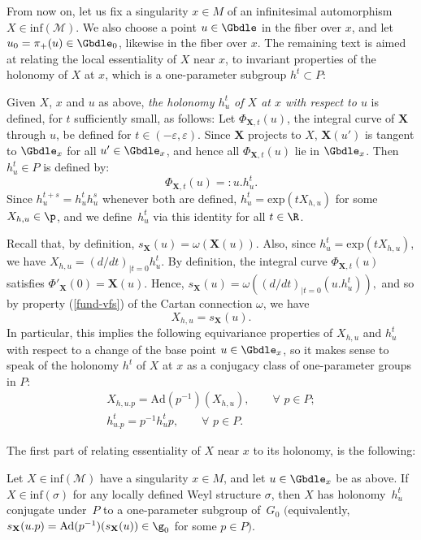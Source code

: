 From now on, let us f\/ix a singularity $x \in M$ of an inf\/initesimal automorphism $X \in \mathrm{inf}(\mathcal{M})$. We also choose a point $u \in \Gbdle$ in the f\/iber over $x$, and let $u_0 = \pi_+(u) \in \Gbdle_0$, likewise in the f\/iber over $x$. The remaining text is aimed at relating the local essentiality of $X$ near $x$, to invariant properties of the holonomy of $X$ at $x$, which is a one-parameter subgroup $h^t \subset P$:

\begin{Definition} \label{holonomy definition} Given $X$, $x$ and $u$ as above, \emph{the holonomy $h_u^t$ of $X$ at $x$ with respect to $u$} is def\/ined, for $t$ suf\/f\/iciently small, as follows: Let $\Phi_{\mathbf{X},t}(u)$, the integral curve of $\mathbf{X}$ through $u$, be def\/ined for $t \in (-\varepsilon,\varepsilon)$. Since $\mathbf{X}$ projects to $X$, $\mathbf{X}(u')$ is tangent to $\Gbdle_x$ for all $u' \in \Gbdle_x$, and hence all $\Phi_{\mathbf{X},t}(u)$ lie in $\Gbdle_x$. Then $h_u^t \in P$ is def\/ined by:
\[
\Phi_{\mathbf{X},t}(u) =: u.h^t_u.
\]
Since $h_u^{t+s} = h_u^th_u^s$ whenever both are def\/ined, $h_u^t = \mathrm{exp}(tX_{h,u})$ for some $X_{h,u} \in \p$, and we def\/ine~$h_u^t$ via this identity for all $t \in \R$.
\end{Definition}

Recall that, by def\/inition, $s_{\mathbf{X}}(u) = \omega(\mathbf{X}(u))$. Also, since $h_u^t = \mathrm{exp}(tX_{h,u})$, we have $X_{h,u} = (d/dt)_{\vert t=0} h_u^t$. By def\/inition, the integral curve $\Phi_{\mathbf{X},t}(u)$ satisf\/ies $\Phi'_{\mathbf{X}}(0) = \mathbf{X}(u)$. Hence, $s_{\mathbf{X}}(u) = \omega((d/dt)_{\vert t=0}(u.h_u^t)),$ and so by property (\ref{fund-vfs}) of the Cartan connection $\omega$, we have
\[
X_{h,u} = s_{\mathbf{X}}(u).
\]
In particular, this implies the following equivariance properties of $X_{h,u}$ and $h_u^t$ with respect to a change of the base point $u \in \Gbdle_x$, so it makes sense to speak of the holonomy $h^t$ of $X$ at $x$ as a conjugacy class of one-parameter groups in $P$:
\begin{gather*}
X_{h,u.p} = \mathrm{Ad}(p^{-1})(X_{h,u}), \qquad \forall \,\, p \in P;\\
h_{u.p}^t = p^{-1}h_u^tp, \qquad \forall \,\, p \in P.
\end{gather*}

The f\/irst part of relating essentiality of $X$ near $x$ to its holonomy, is the following:

\begin{Proposition} \label{necessary holonomy} Let $X \in \mathrm{inf}(\mathcal{M})$ have a singularity $x \in M$, and let $u \in \Gbdle_x$ be as above. If $X \in \mathrm{inf}(\sigma)$ for any locally defined Weyl structure $\sigma$, then $X$ has holonomy~$h_u^t$ conjugate under~$P$ to a one-parameter subgroup of~$G_0$ $($equivalently, $s_{\mathbf{X}}(u.p) = \mathrm{Ad}(p^{-1})(s_{\mathbf{X}}(u)) \in \g_0$ for some $p \in P)$.
\end{Proposition}

